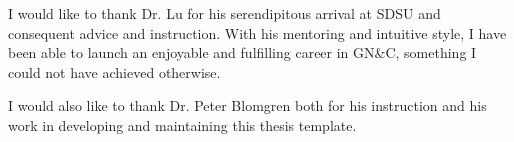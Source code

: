 \documentclass{sdsu-thesis}
\theoremstyle{dtm}
\begin{document}
\begin{acknowledgments}
I would like to thank Dr. Lu for his serendipitous arrival at SDSU and consequent 
advice and instruction. With his mentoring and intuitive style, I have been able to launch an enjoyable 
and fulfilling career in GN\&C, something I could not have achieved otherwise.

I would also like to thank Dr. Peter Blomgren both for his instruction and his work in developing and maintaining this thesis template.

%
\end{acknowledgments}

%
%


% 
% 


% 
% 
% 




\end{document}
